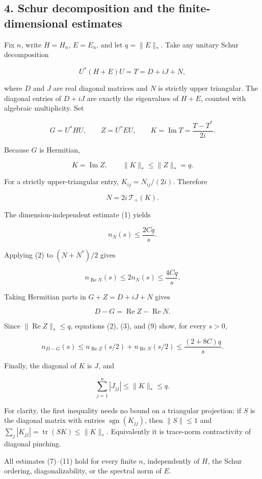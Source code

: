 \documentclass[10pt,a4paper]{article}
\begin{document}
\subsection{4. Schur decomposition and the finite-dimensional
estimates}\label{schur-decomposition-and-the-finite-dimensional-estimates}

Fix \(n\), write \(H=H_n\), \(E=E_n\), and let \(q=\|E\|_*\). Take any
unitary Schur decomposition

\[U^*(H+E)U=T=D+iJ+N,\]

where \(D\) and \(J\) are real diagonal matrices and \(N\) is strictly
upper triangular. The diagonal entries of \(D+iJ\) are exactly the
eigenvalues of \(H+E\), counted with algebraic multiplicity. Set

\[G=U^*HU,\qquad Z=U^*EU,\qquad
K=\operatorname{Im}T=\frac{T-T^*}{2i}.\]

Because \(G\) is Hermitian,

\[K=\operatorname{Im}Z,\qquad \|K\|_*\le\|Z\|_*=q.\tag{7}\]

For a strictly upper-triangular entry, \(K_{ij}=N_{ij}/(2i)\). Therefore

\[N=2i\,\mathcal T_+(K).\]

The dimension-independent estimate (1) yields

\[n_N(s)\le\frac{2Cq}{s}.\tag{8}\]

Applying (2) to \((N+N^*)/2\) gives

\[n_{\operatorname{Re}N}(s)\le2n_N(s)\le\frac{4Cq}{s}.\tag{9}\]

Taking Hermitian parts in \(G+Z=D+iJ+N\) gives

\[D-G=\operatorname{Re}Z-\operatorname{Re}N.\]

Since \(\|\operatorname{Re}Z\|_*\le q\), equations (2), (3), and (9)
show, for every \(s>0\),

\[n_{D-G}(s)
\le n_{\operatorname{Re}Z}(s/2)+n_{\operatorname{Re}N}(s/2)
\le\frac{(2+8C)q}{s}.\tag{10}\]

Finally, the diagonal of \(K\) is \(J\), and

\[\sum_{j=1}^n|J_{jj}|\le\|K\|_*\le q.\tag{11}\]

For clarity, the first inequality needs no bound on a triangular
projection: if \(S\) is the diagonal matrix with entries
\(\operatorname{sgn}(K_{jj})\), then \(\|S\|\le1\) and
\(\sum_j|K_{jj}|=\operatorname{tr}(SK)\le\|K\|_*\). Equivalently it is
trace-norm contractivity of diagonal pinching.

All estimates (7)--(11) hold for every finite \(n\), independently of
\(H\), the Schur ordering, diagonalizability, or the spectral norm of
\(E\).
\end{document}
